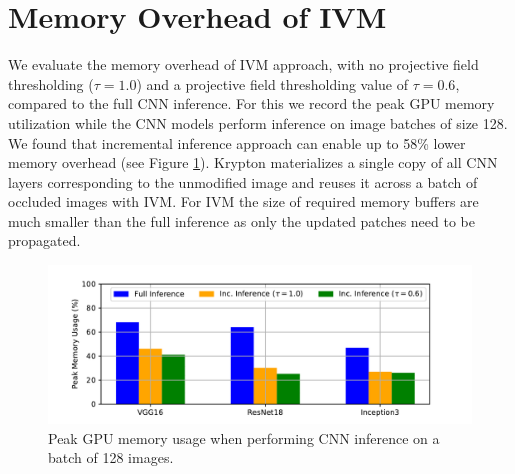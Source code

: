 \section{Memory Overhead of IVM}\label{sec:mem_overhead}
We evaluate the memory overhead of IVM approach, with no projective field thresholding ($\tau=1.0$) and a projective field thresholding value of $\tau=0.6$, compared to the full CNN inference.
For this we record the peak GPU memory utilization while the CNN models perform inference on image batches of size 128.
We found that incremental inference approach can enable up to 58\% lower memory overhead (see Figure \ref{fig:mem_overhead}).
Krypton materializes a single copy of all CNN layers corresponding to the unmodified image and reuses it across a batch of occluded images with IVM. For IVM the size of required memory buffers are much smaller than the full inference as only the updated patches need to be propagated.

\begin{figure}[t]
\includegraphics[width=\columnwidth]{images/mem_overhead}
\vspace{-8mm}
\caption{Peak GPU memory usage when performing CNN inference on a batch of 128 images.}
\vspace{-5mm}
\label{fig:mem_overhead}
\end{figure}

